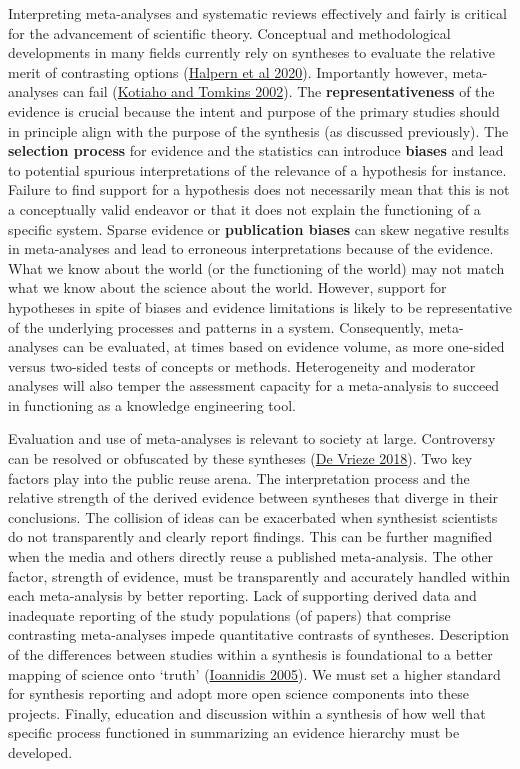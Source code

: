 \documentclass[
]{book}
\begin{document}
Interpreting meta-analyses and systematic reviews effectively and fairly is critical for the advancement of scientific theory. Conceptual and methodological developments in many fields currently rely on syntheses to evaluate the relative merit of contrasting options (\href{https://academic.oup.com/bioscience/article/70/11/1005/5908035}{Halpern et al 2020}). Importantly however, meta-analyses can fail (\href{https://onlinelibrary.wiley.com/doi/full/10.1034/j.1600-0706.2002.960316.x}{Kotiaho and Tomkins 2002}). The \textbf{representativeness} of the evidence is crucial because the intent and purpose of the primary studies should in principle align with the purpose of the synthesis (as discussed previously). The \textbf{selection process} for evidence and the statistics can introduce \textbf{biases} and lead to potential spurious interpretations of the relevance of a hypothesis for instance. Failure to find support for a hypothesis does not necessarily mean that this is not a conceptually valid endeavor or that it does not explain the functioning of a specific system. Sparse evidence or \textbf{publication biases} can skew negative results in meta-analyses and lead to erroneous interpretations because of the evidence. What we know about the world (or the functioning of the world) may not match what we know about the science about the world. However, support for hypotheses in spite of biases and evidence limitations is likely to be representative of the underlying processes and patterns in a system. Consequently, meta-analyses can be evaluated, at times based on evidence volume, as more one-sided versus two-sided tests of concepts or methods. Heterogeneity and moderator analyses will also temper the assessment capacity for a meta-analysis to succeed in functioning as a knowledge engineering tool.

Evaluation and use of meta-analyses is relevant to society at large. Controversy can be resolved or obfuscated by these syntheses (\href{https://www.science.org/news/2018/09/meta-analyses-were-supposed-end-scientific-debates-often-they-only-cause-more}{De Vrieze 2018}). Two key factors play into the public reuse arena. The interpretation process and the relative strength of the derived evidence between syntheses that diverge in their conclusions. The collision of ideas can be exacerbated when synthesist scientists do not transparently and clearly report findings. This can be further magnified when the media and others directly reuse a published meta-analysis. The other factor, strength of evidence, must be transparently and accurately handled within each meta-analysis by better reporting. Lack of supporting derived data and inadequate reporting of the study populations (of papers) that comprise contrasting meta-analyses impede quantitative contrasts of syntheses. Description of the differences between studies within a synthesis is foundational to a better mapping of science onto `truth' (\href{https://journals.plos.org/plosmedicine/article?id=10.1371/journal.pmed.0020124}{Ioannidis 2005}). We must set a higher standard for synthesis reporting and adopt more open science components into these projects. Finally, education and discussion within a synthesis of how well that specific process functioned in summarizing an evidence hierarchy must be developed.
\end{document}
